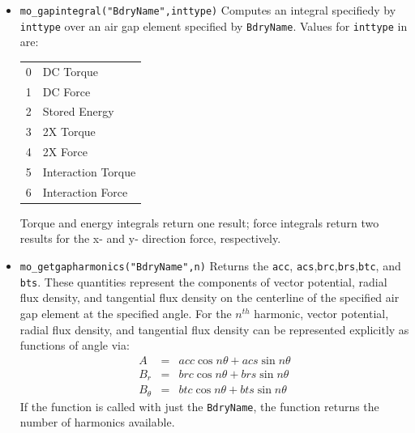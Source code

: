 \begin{itemize}
\item{\verb+mo_gapintegral("BdryName",inttype)+}
Computes an integral specifiedy by \verb+inttype+ over an air gap element specified
by \verb+BdryName+. Values for {\tt inttype} in are:
\begin{center}
\begin{tabular}{ll} \hline
0  & DC Torque\\
1  & DC Force\\
2  & Stored Energy\\
3  & 2X Torque\\
4  & 2X Force\\
5  & Interaction Torque\\
6  & Interaction Force\\
\hline
\end{tabular}
\end{center}
Torque and energy integrals return one result; force integrals return two results for the x- and y- direction force, respectively.

\item{\verb+mo_getgapharmonics("BdryName",n)+}
Returns the {\tt acc}, {\tt acs},{\tt brc},{\tt  brs},{\tt  btc}, and {\tt bts}.  These quantities represent the
components of vector potential, radial flux density, and tangential flux density on the centerline of the specified air gap element at the specified angle.  
For the $n^{th}$ harmonic, vector potential, radial flux density, and tangential flux density can be represented explicitly as functions of angle via:
\begin{eqnarray}
A    & = & acc \cos{n \theta} + acs \sin{n \theta} \nonumber  \\ 
B_r & = & brc \cos{n \theta}+ brs \sin{n \theta}   \nonumber \\
B_\theta & = & btc \cos{n \theta} + bts \sin{n \theta}  \nonumber
\end{eqnarray}
If the function is called with just the {\tt BdryName}, the function returns the number of harmonics available.
 
\end{itemize}

